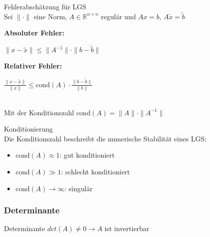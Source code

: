 \begin{theorem}{Fehlerabschätzung für LGS}\\
Sei $\|\cdot\|$ eine Norm, $A \in \mathbb{R}^{n\times n}$ regulär und $Ax = b$, $A\tilde{x} = \tilde{b}$
\vspace{1mm}\\
\begin{minipage}[t]{0.47\textwidth}
    \textbf{Absoluter Fehler:}
    \vspace{-5mm}\\
    \begin{center}
        $\|x - \tilde{x}\| \leq \|A^{-1}\| \cdot \|b - \tilde{b}\|$
    \end{center}
\end{minipage}
\hspace{2mm}
\begin{minipage}[t]{0.47\textwidth}
    \textbf{Relativer Fehler:}
    \vspace{-5mm}\\
    \begin{center}
        $\frac{\|x - \tilde{x}\|}{\|x\|} \leq \text{cond}(A) \cdot \frac{\|b - \tilde{b}\|}{\|b\|}$
    \end{center}
\end{minipage}
\vspace{1mm}\\
Mit der Konditionszahl $\text{cond}(A) = \|A\| \cdot \|A^{-1}\|$
\end{theorem}

\begin{concept}{Konditionierung}\\
Die Konditionszahl beschreibt die numerische Stabilität eines LGS:
\begin{itemize}
    \item $\text{cond}(A) \approx 1$: gut konditioniert
    \item $\text{cond}(A) \gg 1$: schlecht konditioniert
    \item $\text{cond}(A) \to \infty$: singulär
\end{itemize}
\end{concept}



\raggedcolumns
\columnbreak

\subsubsection{Determinante}

    \begin{definition}{Determinante} $det(A) \neq 0 \rightarrow A$ ist invertierbar
    \end{definition}

